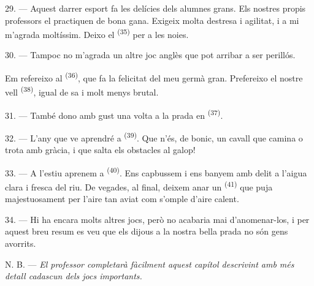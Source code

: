 29. --- Aquest darrer esport fa les delícies dels alumnes grans. Els nostres propis professors
el practiquen de bona gana. Exigeix molta destresa i agilitat, i a mi m'agrada moltíssim.
Deixo el  \textsuperscript{(35)} per a les noies.

30. --- Tampoc no m'agrada un altre joc anglès que pot arribar a ser perillós.

Em refereixo al  \textsuperscript{(36)}, que fa la felicitat del meu germà
gran. Prefereixo el nostre vell  \textsuperscript{(38)}, igual de sa i
molt menys brutal.

\VUsaut{4.6mm}
\VUsaut{3.0mm}

31. --- També dono amb gust una volta a la prada en  \textsuperscript{(37)}.

32. --- L'any que ve aprendré a  \textsuperscript{(39)}. Que n'és, de
bonic, un cavall que camina o trota amb gràcia, i que salta els obstacles al galop!

33. --- A l'estiu aprenem a  \textsuperscript{(40)}. Ens capbussem i ens banyem
amb delit a l'aigua clara i fresca del riu. De vegades, al final, deixem anar un
 \textsuperscript{(41)} que puja majestuosament per l'aire tan aviat
com s'omple d'aire calent.

34. --- Hi ha encara molts altres jocs, però no acabaria mai d'anomenar-los, i per aquest breu
resum es veu que els dijous a la nostra bella prada no són gens avorrits.

N. B. --- \textit{El professor completarà fàcilment aquest capítol descrivint amb més detall
cadascun dels jocs importants.}
\VUsaut{6.0mm}
\VUfilet{22mm}
